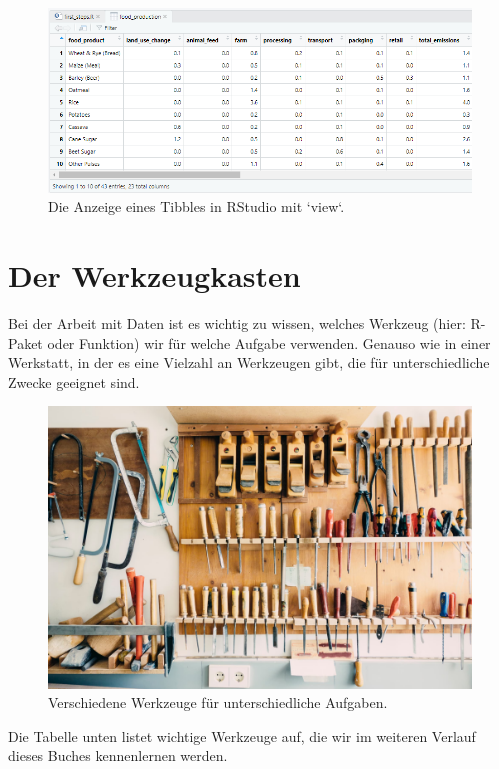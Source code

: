 \documentclass[
]{book}
\begin{document}
\begin{figure}
\includegraphics[width=1\linewidth]{fig/view_result_rstudio} \caption{Die Anzeige eines Tibbles in RStudio mit `view`.}\label{fig:fig-view-rstudio}
\end{figure}

\hypertarget{der-werkzeugkasten}{%
\chapter{Der Werkzeugkasten}\label{der-werkzeugkasten}}

Bei der Arbeit mit Daten ist es wichtig zu wissen, welches Werkzeug (hier: R-Paket oder Funktion) wir für welche Aufgabe verwenden. Genauso wie in einer Werkstatt, in der es eine Vielzahl an Werkzeugen gibt, die für unterschiedliche Zwecke geeignet sind.

\begin{figure}
\includegraphics[width=1\linewidth]{fig/tool_set} \caption{Verschiedene Werkzeuge für unterschiedliche Aufgaben.}\label{fig:fig-werkzeuge}
\end{figure}

Die Tabelle unten listet wichtige Werkzeuge auf, die wir im weiteren Verlauf dieses Buches kennenlernen werden.
\end{document}
